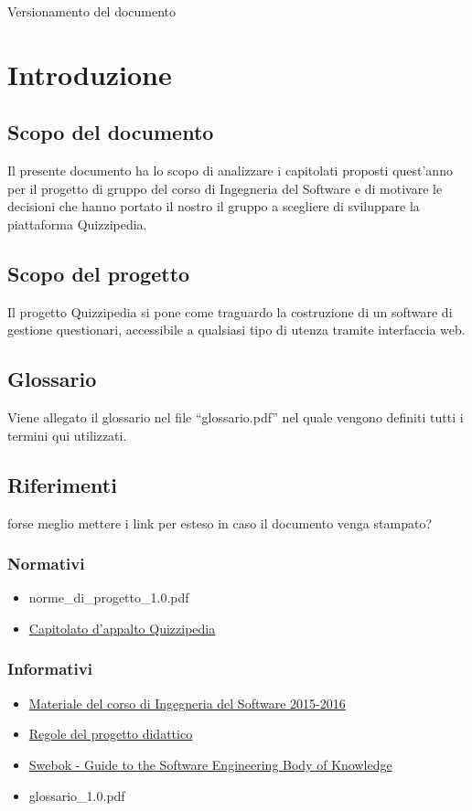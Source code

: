 \documentclass[a4paper,11pt]{article}
\begin{document}
			
			
			
			
			
			\caption{Versionamento del documento} 
		\fineregistro
	
\newpage
	\fancyhead[R]{\leftmark}
	\tableofcontents
	\newpage

\section{Introduzione}

\subsection{Scopo del documento}
Il presente documento ha lo scopo di analizzare i capitolati proposti quest'anno per il progetto di gruppo del corso di Ingegneria del Software e di motivare le decisioni che hanno portato il nostro il gruppo a scegliere di sviluppare la piattaforma Quizzipedia.
\subsection{Scopo del progetto}
Il progetto Quizzipedia si pone come traguardo la costruzione di un software di gestione questionari, accessibile a qualsiasi tipo di utenza tramite interfaccia web.
\subsection{Glossario}
Viene allegato il glossario nel file “glossario.pdf” nel quale vengono definiti tutti i
termini qui utilizzati.
\subsection{Riferimenti}
forse meglio mettere i link per esteso in caso il documento venga stampato?
\subsubsection{Normativi}
\begin{itemize}
	\item norme\_di\_progetto\_1.0.pdf
	\item \href{http://www.math.unipd.it/~tullio/IS-1/2015/Progetto/C5.pdf}{Capitolato d'appalto Quizzipedia}	
\end{itemize}
\subsubsection{Informativi}
\begin{itemize}
	\item \href{http://www.math.unipd.it/~tullio/IS-1/2015/}{Materiale del corso di Ingegneria del Software 2015-2016}
	\item \href{http://www.math.unipd.it/~tullio/IS-1/2015/Dispense/PD01.pdf}{Regole del progetto didattico}
	\item \href{http://www.computer.org/web/swebok/index}{Swebok - Guide to the Software Engineering Body of Knowledge}
	\item glossario\_1.0.pdf
\end{itemize}
\end{document}
